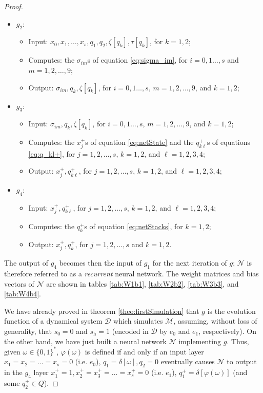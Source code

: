 \documentclass{book}
\newcommand{\h}{\mathrm{h}}
\theoremstyle{definition}
\theoremstyle{plain}
\theoremstyle{plain}
\theoremstyle{remark}
\theoremstyle{plain}
\begin{document}
\begin{proof}
\begin{itemize}
			\item $g_2$:
			\begin{itemize}
				\item Input: $x_0,x_1,\dots,x_s,q_1,q_2,\zeta[q_k],\tau[q_k]$, for $k=1,2$;
				\item Computes: the $\sigma_{im}$s of equation \ref{eq:sigma_im}, for $i=0,1\dots,s$ and $m=1,2,\dots,9$;
				\item Output: $\sigma_{im},q_k,\zeta[q_k]$, for $i=0,1\dots,s$, $m=1,2,\dots,9$, and $k=1,2$;
			\end{itemize}
			\item $g_3$:
			\begin{itemize}
				\item Input: $\sigma_{im},q_k,\zeta[q_k]$, for $i=0,1\dots,s$, $m=1,2,\dots,9$, and $k=1,2$;
				\item Computes: the $x_j^+$s of equation \ref{eq:netState} and the $q_{k\ell}^+$s of equations \ref{eq:q_kl+}, for $j=1,2,\dots,s$, $k=1,2$, and $\ell=1,2,3,4$;
				\item Output: $x_j^+,q_{k\ell}^+$, for $j=1,2,\dots,s$, $k=1,2$, and $\ell=1,2,3,4$;
			\end{itemize}
			\item $g_4$:
			\begin{itemize}
				\item Input: $x_j^+,q_{k\ell}^+$, for $j=1,2,\dots,s$, $k=1,2$, and $\ell=1,2,3,4$;
				\item Computes: the $q_k^+$s of equation \ref{eq:netStacks}, for $k=1,2$;
				\item Output: $x_j^+,q_k^+$, for $j=1,2,\dots,s$ and $k=1,2$.
			\end{itemize}
		\end{itemize}
		The output of $g_4$ becomes then the input of $g_1$ for the next iteration of $g$; $\mathcal{N}$ is therefore referred to as a \emph{recurrent} neural network. The weight matrices and bias vectors of $\mathcal{N}$ are shown in tables \ref{tab:W1b1}, \ref{tab:W2b2}, \ref{tab:W3b3}, and \ref{tab:W4b4}.
		
		
		
		
		
		We have already proved in theorem \ref{theo:firstSimulation} that $g$ is the evolution function of a dynamical system $\mathcal{D}$ which simulates $\mathcal{M}$, assuming, without loss of generality, that $s_0=0$ and $s_\h=1$ (encoded in $\mathcal{D}$ by $e_0$ and $e_1$, respectively). On the other hand, we have just built a neural network $\mathcal{N}$ implementing $g$. Thus, given $\omega\in\{0,1\}^*$, $\varphi(\omega)$ is defined if and only if an input layer $x_1=x_2=\dots=x_s=0$ (i.e. $e_0$), $q_1=\delta[\omega],q_2=0$ eventually causes $\mathcal{N}$ to output in the $g_4$ layer $x_1^+=1,x_2^+=x_3^+=\dots=x_s^+=0$ (i.e. $e_1$), $q_1^+=\delta[\varphi(\omega)]$ (and some $q_2^+\in Q$).
	\end{proof}
	
\end{document}
